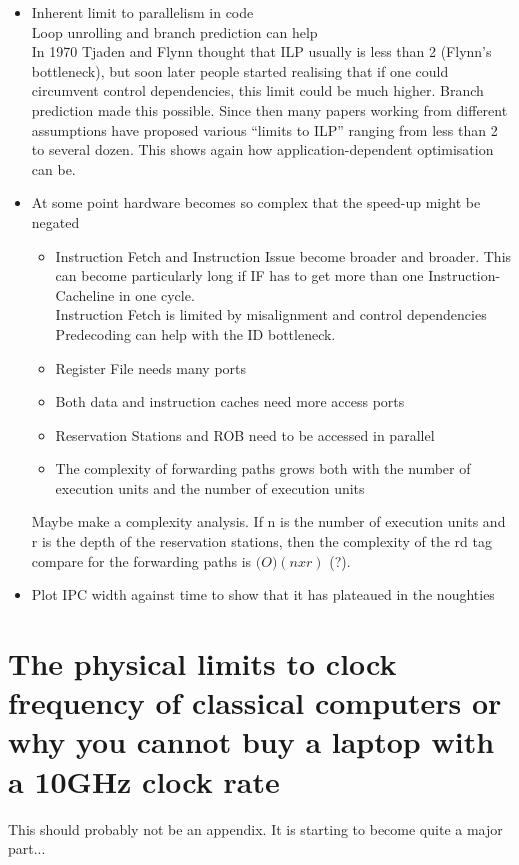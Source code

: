 \documentclass[12pt,a4paper]{article}
\newcommand{\note}{\textcolor{WildStrawberry}}
\begin{document}
\begin{itemize}
    \item Inherent limit to parallelism in code\\
              Loop unrolling and branch prediction can help\\
              In 1970 Tjaden and Flynn thought that ILP usually is less than 2 (Flynn's bottleneck), but soon later people started realising that if one could circumvent control dependencies, this limit could be much higher. Branch prediction made this possible. Since then many papers working from different assumptions have proposed various ``limits to ILP'' ranging from less than 2 to several dozen. This shows again how application-dependent optimisation can be. \cite[p.25]{lipastiShen}
    \item At some point hardware becomes so complex that the speed-up might be negated
                \begin{itemize}
                    \item Instruction Fetch and Instruction Issue become broader and broader. This can become particularly long if IF has to get more than one Instruction-Cacheline in one cycle.\\
                    Instruction Fetch is limited by misalignment and control dependencies \\
                    Predecoding can help with the ID bottleneck.
                    \item Register File needs many ports
                    \item Both data and instruction caches need more access ports
                    \item Reservation Stations and ROB need to be accessed in parallel
                    \item The complexity of forwarding paths grows both with the number of execution units and the number of execution units
                \end{itemize}
            Maybe make a complexity analysis. If n is the number of execution units and r is the depth of the reservation stations, then the complexity of the rd tag compare for the forwarding paths is $\mathcal(O)(nxr)$ (?).
    \item Plot IPC width against time to show that it has plateaued in the noughties
\end{itemize}


\newpage
\appendix
\section{The physical limits to clock frequency of classical computers or why you cannot buy a laptop with a 10GHz clock rate}
\label{physicallimits}
\note{This should probably not be an appendix. It is starting to become quite a major part...}\\
\end{document}
